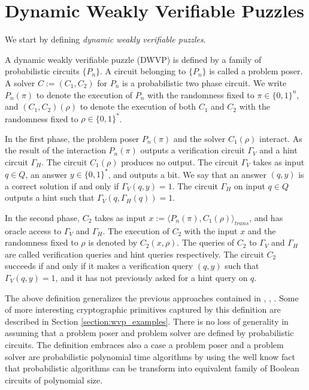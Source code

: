 \documentclass[11pt,a4paper,titlepage]{memoir}
\begin{document}
\section{Dynamic Weakly Verifiable Puzzles}
\label{section:wvp}
We start by defining \textit{dynamic weakly verifiable puzzles}.
\begin{definition}
  \label{def:dwvp}
  A dynamic weakly verifiable puzzle (DWVP) is defined by a family of probabilistic circuits $\{P_n\}$.
  A circuit belonging to $\{P_n\}$ is called a problem poser.
  A solver $C := (C_1, C_2)$ for $P_n$ is a probabilistic two phase circuit.
  We write $P_n(\pi)$ to denote the execution of $P_n$ with the randomness fixed to $\pi \in \{0,1\}^n$, and $(C_1,C_2)(\rho)$
  to denote the execution of both $C_1$ and $C_2$ with the randomness fixed to $\rho \in \{0,1\}^{*}$.

  In the first phase, the problem poser $P_n(\pi)$ and the solver $C_1(\rho)$ interact.
  As the result of the interaction $P_n(\pi)$ outputs a verification circuit $\Gamma_{V}$ and a hint circuit $\Gamma_{H}$.
  The circuit $C_1(\rho)$ produces no output.
  The circuit $\Gamma_{V}$ takes as input $q \in Q$, an answer $y \in \{0,1\}^*$,
  and outputs a bit. We say that an answer $(q,y)$ is a correct solution if and only if $\Gamma_V(q,y) = 1$.
  The circuit $\Gamma_H$ on input $q \in Q$ outputs a hint such that $\Gamma_V(q,\Gamma_H(q)) = 1$.

  In the second phase, $C_2$ takes as input $x := \langle P_n(\pi), C_1(\rho) \rangle_{\mathit{trans}}$,
  and has oracle access to $\Gamma_V$ and $\Gamma_H$.
  The execution of $C_2$ with the input $x$ and the randomness fixed to $\rho$
  is denoted by $C_2(x, \rho)$. The queries of $C_2$ to $\Gamma_V$ and $\Gamma_H$ are called verification queries and hint queries respectively.
  The circuit $C_2$ succeeds if and only if it makes a verification query $(q,y)$ such that $\Gamma_V(q,y) = 1$,
  and it has not previously asked for a hint query on $q$.
\end{definition}

The above definition generalizes the previous approaches contained in \cite{canetti2004hardness}, \cite{Dodis:2009:SAI:1530441.1530450}, \cite{DBLP:journals/corr/abs-1002-3534}.
Some of more interesting cryptographic primitives captured by this definition are described in Section \ref{section:wvp_examples}.
There is no loss of generality in assuming that a problem poser and problem solver are defined by probabilistic circuits.
The definition embraces also a case a problem poser and a problem solver are probabilistic polynomial time algorithms
by using the well know fact \cite{LectureNotesCT} that probabilistic algorithms can be transform into equivalent family of Boolean circuits of polynomial size.
\end{document}
